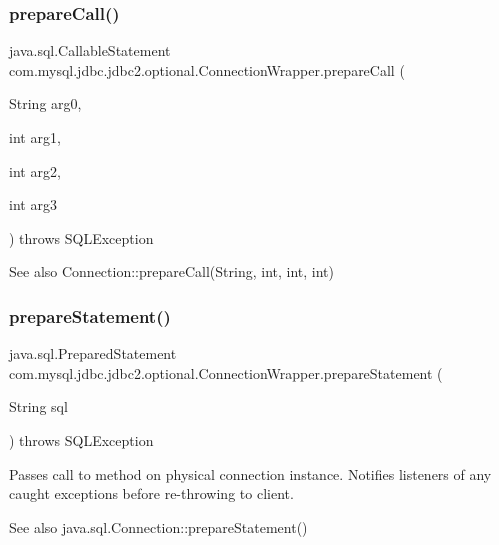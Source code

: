 \subsubsection{\texorpdfstring{prepare\+Call()}{prepareCall()}\hspace{0.1cm}{\footnotesize\ttfamily [3/3]}}
{\footnotesize\ttfamily java.\+sql.\+Callable\+Statement com.\+mysql.\+jdbc.\+jdbc2.\+optional.\+Connection\+Wrapper.\+prepare\+Call (\begin{DoxyParamCaption}\item[{String}]{arg0,  }\item[{int}]{arg1,  }\item[{int}]{arg2,  }\item[{int}]{arg3 }\end{DoxyParamCaption}) throws S\+Q\+L\+Exception}

\begin{DoxySeeAlso}{See also}
Connection\+::prepare\+Call(\+String, int, int, int) 
\end{DoxySeeAlso}
\mbox{\label{classcom_1_1mysql_1_1jdbc_1_1jdbc2_1_1optional_1_1_connection_wrapper_afbef35842f10c99af1e6f132d0a5950f}} 
\subsubsection{\texorpdfstring{prepare\+Statement()}{prepareStatement()}\hspace{0.1cm}{\footnotesize\ttfamily [1/6]}}
{\footnotesize\ttfamily java.\+sql.\+Prepared\+Statement com.\+mysql.\+jdbc.\+jdbc2.\+optional.\+Connection\+Wrapper.\+prepare\+Statement (\begin{DoxyParamCaption}\item[{String}]{sql }\end{DoxyParamCaption}) throws S\+Q\+L\+Exception}

Passes call to method on physical connection instance. Notifies listeners of any caught exceptions before re-\/throwing to client.

\begin{DoxySeeAlso}{See also}
java.\+sql.\+Connection\+::prepare\+Statement() 
\end{DoxySeeAlso}
\mbox{\label{classcom_1_1mysql_1_1jdbc_1_1jdbc2_1_1optional_1_1_connection_wrapper_ae2d029665ab95f9f0db077f5227ac32f}} 
